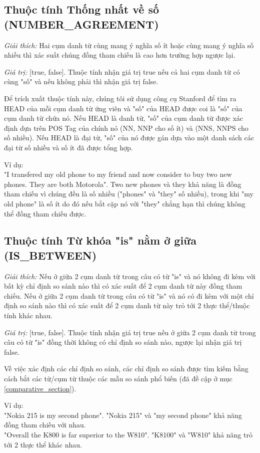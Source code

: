 \documentclass[12pt]{report}
\begin{document}
			\subsection*{Thuộc tính Thống nhất về số (NUMBER\_AGREEMENT)}
				\par \textit{Giải thích:} Hai cụm danh từ cùng mang ý nghĩa số ít hoặc cùng mang ý nghĩa số nhiều thì xác suất chúng đồng tham chiếu là cao hơn trường hợp ngược lại. 
				\par \textit{Giá trị:} [true, false]. Thuộc tính nhận giá trị true nếu cả hai cụm danh từ có cùng "số" và nếu không phải thì nhận giá trị false.
				\par Để trích xuất thuộc tính này, chúng tôi sử dụng công cụ Stanford để tìm ra HEAD của mỗi cụm danh từ ứng viên và "số" của HEAD được coi là "số" của cụm danh từ chứa nó. Nếu HEAD là danh từ, "số" của cụm danh từ được xác định dựa trên POS Tag của chính nó (NN, NNP cho số ít) và (NNS, NNPS cho số nhiều). Nếu HEAD là đại từ, "số" của nó được gán dựa vào một danh sách các đại từ số nhiều và số ít đã được tổng hợp.
				\par Ví dụ:
				\\"I transfered my old phone to my friend and now consider to buy two new phones. They are both Motorola". Two new phones và they khả năng là đồng tham chiếu vì chúng đều là số nhiều ("phones" và "they" số nhiều), trong khi "my old phone" là số ít do đó nếu bắt cặp nó với "they" chẳng hạn thì chúng không thể đồng tham chiếu được.				

			\subsection*{Thuộc tính Từ khóa "is" nằm ở giữa (IS\_BETWEEN)}
				\par \textit{Giải thích:} Nếu ở giữa 2 cụm danh từ trong câu có từ "is" và nó không đi kèm với bất kỳ chỉ định so sánh nào thì có xác suất để 2 cụm danh từ này đồng tham chiếu. Nếu ở giữa 2 cụm danh từ trong câu có từ "is" và nó có đi kèm với một chỉ định so sánh nào thì có xác suất để 2 cụm danh từ này trỏ tới 2 thực thể/thuộc tính khác nhau.
				\par \textit{Giá trị:} [true, false]. Thuộc tính nhận giá trị true nếu ở giữa 2 cụm danh từ trong câu có từ "is" đồng thời không có chỉ định so sánh nào, ngược lại nhận giá trị false.
				\par Về việc xác định các chỉ định so sánh, các chỉ định so sánh được tìm kiếm bằng cách bắt các từ/cụm từ thuộc các mẫu so sánh phổ biến (đã đề cập ở mục \ref{comparative_section}).
				\par Ví dụ: 
				\\"Nokia 215 is my second phone". "Nokia 215" và "my second phone" khả năng đồng tham chiếu với nhau.
				\\"Overall the K800 is far superior to the W810". "K8100" và "W810" khả năng trỏ tới 2 thực thể khác nhau.
\end{document}
